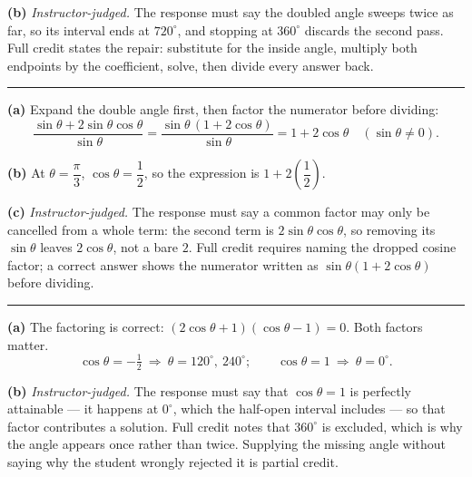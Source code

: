 \documentclass[12pt]{article}
\begin{document}
\textbf{(b)} \emph{Instructor-judged.} The response must say the doubled angle sweeps twice as far, so its interval ends at $720^\circ$, and stopping at $360^\circ$ discards the second pass. Full credit states the repair: substitute for the inside angle, multiply both endpoints by the coefficient, solve, then divide every answer back.

\vspace{0.12cm}\noindent\rule{\linewidth}{0.2pt}\vspace{0.12cm}


\textbf{(a)} Expand the double angle first, then factor the numerator before dividing:
\[ \frac{\sin\theta + 2\sin\theta\cos\theta}{\sin\theta} = \frac{\sin\theta\,(1 + 2\cos\theta)}{\sin\theta} = 1 + 2\cos\theta \quad (\sin\theta \ne 0). \]

\textbf{(b)} At $\theta = \dfrac{\pi}{3}$, $\cos\theta = \dfrac{1}{2}$, so the expression is $1 + 2\left(\dfrac{1}{2}\right)$. 

\textbf{(c)} \emph{Instructor-judged.} The response must say a common factor may only be cancelled from a whole term: the second term is $2\sin\theta\cos\theta$, so removing its $\sin\theta$ leaves $2\cos\theta$, not a bare $2$. Full credit requires naming the dropped cosine factor; a correct answer shows the numerator written as $\sin\theta(1 + 2\cos\theta)$ before dividing.

\vspace{0.12cm}\noindent\rule{\linewidth}{0.2pt}\vspace{0.12cm}


\textbf{(a)} The factoring is correct: $(2\cos\theta + 1)(\cos\theta - 1) = 0$. Both factors matter.
\[ \cos\theta = -\tfrac{1}{2} \ \Longrightarrow\ \theta = 120^\circ,\ 240^\circ; \qquad \cos\theta = 1 \ \Longrightarrow\ \theta = 0^\circ. \]

\textbf{(b)} \emph{Instructor-judged.} The response must say that $\cos\theta = 1$ is perfectly attainable --- it happens at $0^\circ$, which the half-open interval includes --- so that factor contributes a solution. Full credit notes that $360^\circ$ is excluded, which is why the angle appears once rather than twice. Supplying the missing angle without saying why the student wrongly rejected it is partial credit.
\end{document}

